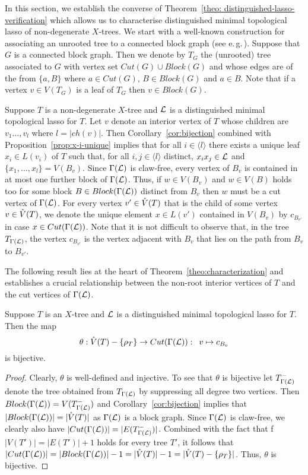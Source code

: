 In this section, we establish the converse of Theorem~\ref{theo:
  distinguished-lasso-verification} which allows us to characterise
distinguished minimal topological lasso of non-degenerate $X$-trees.  We start
with a well-known construction for associating an unrooted tree to a connected
block graph (see e.\,g.\,\cite{diestel}).  Suppose that $G$ is a connected
block graph. Then we denote by $T_G$ the (unrooted) tree associated to $G$
with vertex set $Cut(G)\cup Block(G)$ and whose edges are of the from
$\{a,B\}$ where $a\in Cut(G)$, $B\in Block(G)$ and $a\in B$. Note that if a
vertex $v\in V(T_G)$ is a leaf of $T_G$ then $v\in Block(G)$.

Suppose $T$ is a non-degenerate $X$-tree and ${\mathcal L}$ is a distinguished minimal
topological lasso for $T$.  Let $v$ denote an interior vertex of $T$ whose
children are $v_1\ldots,v_l$ where $l=|ch(v)|$. Then
Corollary~\ref{cor:bijection} combined with Proposition~\ref{prop:x-i-unique}
implies that for all $i\in\langle l\rangle$ there exists a unique leaf $x_i\in
L(v_i)$ of $T$ such that, for all $i,j\in\langle l\rangle$ distinct,
$x_ix_j\in {\mathcal L}$ and $\{x_1,\ldots, x_l\}=V(B_v)$. Since $\Gamma({\mathcal L})$ is
claw-free, every vertex of $B_v$ is contained in at most one further block of
$\Gamma({\mathcal L})$. Thus, if $w\in V(B_v)$ and $w\in V(B) $ holds too for some
block $B\in Block(\Gamma({\mathcal L}))$ distinct from $B_v$ then $w$ must be a cut
vertex of $\Gamma({\mathcal L})$. For every vertex $v'\in \mathring{V}(T)$ that is the child of
some vertex $v\in \mathring{V}(T)$, we denote the unique element $x\in L(v')$ contained
in $V(B_v)$ by $c_{B_{v'}}$ in case $x\in Cut(\Gamma({\mathcal L}))$.  Note that it is
not difficult to observe that, in the tree $T_{\Gamma({\mathcal L})}$, the vertex
$c_{B_{v'}}$ is the vertex adjacent with $B_v$ that lies on the path from
$B_v$ to $B_{v'}$.

The following result lies at the heart of Theorem~\ref{theo:characterization}
and establishes a crucial relationship between the non-root interior vertices
of $T$ and the cut vertices of $\Gamma({\mathcal L})$.

\begin{lem}
  \label{lem:bijection-theta}
  Suppose $T$ is an $X$-tree and ${\mathcal L}$ is a distinguished minimal topological
  lasso for $T$. Then the map
$$
\theta :\mathring{V}(T)-\{\rho_T\} \to Cut(\Gamma({\mathcal L})):\,\,\,v\mapsto c_{B_{v}}
$$ 
is bijective.
\end{lem}
\begin{proof}
  Clearly, $\theta$ is well-defined and injective. To see that $\theta$ is
  bijective let $ T_{\Gamma({\mathcal L})}^-$ denote the tree obtained from $
  T_{\Gamma({\mathcal L})}$ by suppressing all degree two vertices. Then
  $Block(\Gamma({\mathcal L}))=V(T_{\Gamma({\mathcal L})}^-)$ and Corollary~\ref{cor:bijection}
  implies that $|Block(\Gamma({\mathcal L}))|=|\mathring{V}(T)|$ as $\Gamma({\mathcal L})$ is a block
  graph. Since $\Gamma({\mathcal L})$ is claw-free, we clearly also have
  $|Cut(\Gamma({\mathcal L}))|=|E(T_{\Gamma({\mathcal L})}^-)|$. Combined with the fact that f
  $|V(T')|= |E(T')|+1$ holds for every tree $T'$, it follows that
  $|Cut(\Gamma({\mathcal L}))|=|Block(\Gamma({\mathcal L}))|-1=|\mathring{V}(T)|-1=
  |\mathring{V}(T)-\{\rho_T\}|$. Thus, $\theta$ is bijective.  \qquad
\end{proof}


